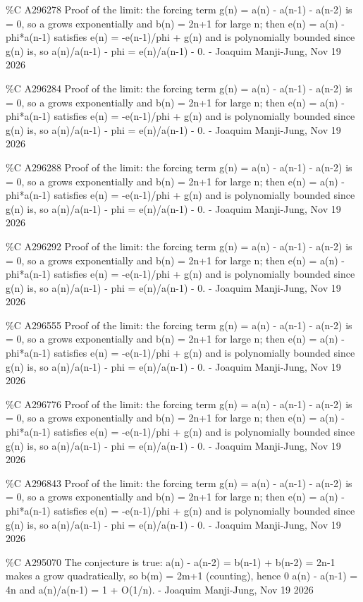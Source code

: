 {\%C A296278 Proof of the limit: the forcing term g(n) = a(n) - a(n-1) - a(n-2) is = 0, so a grows exponentially and b(n) = 2n+1 for large n; then e(n) = a(n) - phi*a(n-1) satisfies e(n) = -e(n-1)/phi + g(n) and is polynomially bounded since g(n) is, so a(n)/a(n-1) - phi = e(n)/a(n-1) - 0. - Joaquim Manji-Jung, Nov 19 2026\par
\%C A296284 Proof of the limit: the forcing term g(n) = a(n) - a(n-1) - a(n-2) is = 0, so a grows exponentially and b(n) = 2n+1 for large n; then e(n) = a(n) - phi*a(n-1) satisfies e(n) = -e(n-1)/phi + g(n) and is polynomially bounded since g(n) is, so a(n)/a(n-1) - phi = e(n)/a(n-1) - 0. - Joaquim Manji-Jung, Nov 19 2026\par
\%C A296288 Proof of the limit: the forcing term g(n) = a(n) - a(n-1) - a(n-2) is = 0, so a grows exponentially and b(n) = 2n+1 for large n; then e(n) = a(n) - phi*a(n-1) satisfies e(n) = -e(n-1)/phi + g(n) and is polynomially bounded since g(n) is, so a(n)/a(n-1) - phi = e(n)/a(n-1) - 0. - Joaquim Manji-Jung, Nov 19 2026\par
\%C A296292 Proof of the limit: the forcing term g(n) = a(n) - a(n-1) - a(n-2) is = 0, so a grows exponentially and b(n) = 2n+1 for large n; then e(n) = a(n) - phi*a(n-1) satisfies e(n) = -e(n-1)/phi + g(n) and is polynomially bounded since g(n) is, so a(n)/a(n-1) - phi = e(n)/a(n-1) - 0. - Joaquim Manji-Jung, Nov 19 2026\par
\%C A296555 Proof of the limit: the forcing term g(n) = a(n) - a(n-1) - a(n-2) is = 0, so a grows exponentially and b(n) = 2n+1 for large n; then e(n) = a(n) - phi*a(n-1) satisfies e(n) = -e(n-1)/phi + g(n) and is polynomially bounded since g(n) is, so a(n)/a(n-1) - phi = e(n)/a(n-1) - 0. - Joaquim Manji-Jung, Nov 19 2026\par
\%C A296776 Proof of the limit: the forcing term g(n) = a(n) - a(n-1) - a(n-2) is = 0, so a grows exponentially and b(n) = 2n+1 for large n; then e(n) = a(n) - phi*a(n-1) satisfies e(n) = -e(n-1)/phi + g(n) and is polynomially bounded since g(n) is, so a(n)/a(n-1) - phi = e(n)/a(n-1) - 0. - Joaquim Manji-Jung, Nov 19 2026\par
\%C A296843 Proof of the limit: the forcing term g(n) = a(n) - a(n-1) - a(n-2) is = 0, so a grows exponentially and b(n) = 2n+1 for large n; then e(n) = a(n) - phi*a(n-1) satisfies e(n) = -e(n-1)/phi + g(n) and is polynomially bounded since g(n) is, so a(n)/a(n-1) - phi = e(n)/a(n-1) - 0. - Joaquim Manji-Jung, Nov 19 2026\par
\%C A295070 The conjecture is true: a(n) - a(n-2) = b(n-1) + b(n-2) = 2n-1 makes a grow quadratically, so b(m) = 2m+1 (counting), hence 0  a(n) - a(n-1) = 4n and a(n)/a(n-1) = 1 + O(1/n). - Joaquim Manji-Jung, Nov 19 2026\par
}
